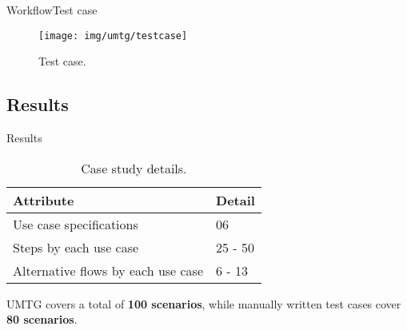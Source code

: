 \documentclass[10pt]{beamer}
\newcommand{\1}{
        	\setbeamertemplate{background}{
        		\texttt{[image: img/1]}
        		\tikz[overlay] \fill[fill opacity=0.75,fill=white] (0,0) rectangle (-\paperwidth,\paperheight);
        	}
}
\begin{document}
\begin{frame}{Workflow}{Test case}	
	\begin{figure}
		\centering
		\texttt{[image: img/umtg/testcase]}
		\caption{Test case.}
	\end{figure}	
\end{frame}




\subsection{Results}



\begin{frame}{Results}{}	
	
	\begin{table}
		\caption{Case study details.}
		\begin{tabular}{|p{6cm}|p{3.8cm}|}
			\hline 
			\textbf{Attribute} & \textbf{Detail}   \\	\hline 
			Use case specifications & 06 \\ \hline
			Steps by each use case & 25 - 50 \\ \hline
			Alternative flows by each use case & 6 - 13 \\ \hline			
		\end{tabular}
	\end{table}	

	\begin{block}{}
			UMTG covers a total of \textbf{100 scenarios}, while manually written test cases cover \textbf{80 scenarios}.		
	\end{block}

\end{frame}
\end{document}
